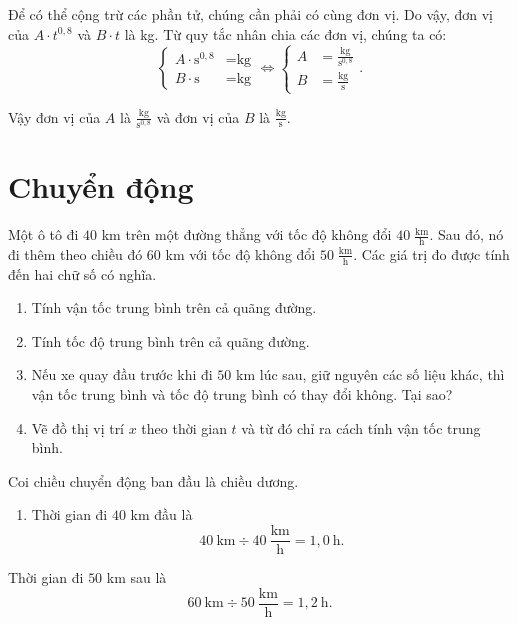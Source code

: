 \documentclass[a4paper, titlepage, openany]{book}
\newcounter{exercise}
\newcounter{solution}
\begin{document}
\solution

Để có thể cộng trừ các phần tử, chúng cần phải có cùng đơn vị. Do vậy, đơn vị của $A\cdot t^{0{,}8}$ và $B\cdot t$ là kg. Từ quy tắc nhân chia các đơn vị, chúng ta có:
\begin{equation*}
   \begin{cases}
     A\cdot \text{s}^{0{,}8} &=\text{kg} \\
     B\cdot\text{s} &=\text{kg}
   \end{cases}
   \iff
   \begin{cases}
      A &=\frac{\text{kg}}{\text{s}^{0{,}8}} \\
      B&=\frac{\text{kg}}{\text{s}}
   \end{cases}.
\end{equation*}

Vậy đơn vị của $A$ là $\boxed{\frac{\text{kg}}{\text{s}^{0{,}8}}}$ và đơn vị của $B$ là $\boxed{\frac{\text{kg}}{\text{s}}}$.

\chapter{Chuyển động}

\exercise Một ô tô đi $40$ km trên một đường thẳng với tốc độ không đổi $40\;\frac{\text{km}}{\text{h}}$. Sau đó, nó đi thêm theo chiều đó $60$ km với tốc độ không đổi $50\;\frac{\text{km}}{\text{h}}$. Các giá trị đo được tính đến hai chữ số có nghĩa.
\begin{enumerate}
   \item Tính vận tốc trung bình trên cả quãng đường.
   \item Tính tốc độ trung bình trên cả quãng đường.
   \item Nếu xe quay đầu trước khi đi $50$ km lúc sau, giữ nguyên các số liệu khác, thì vận tốc trung bình và tốc độ trung bình có thay đổi không. Tại sao?
   \item Vẽ đồ thị vị trí $x$ theo thời gian $t$ và từ đó chỉ ra cách tính vận tốc trung bình.
\end{enumerate}
\solution

Coi chiều chuyển động ban đầu là chiều dương.

\begin{enumerate}
   \item Thời gian đi $40$ km đầu là $$40\ \text{km}\div 40\ \frac{\text{km}}{\text{h}}=1{,}0\ \text{h}.$$
\end{enumerate}

Thời gian đi $50$ km sau là $$60\ \text{km}\div 50\ \frac{\text{km}}{\text{h}}=1{,}2\ \text{h}.$$
\end{document}
